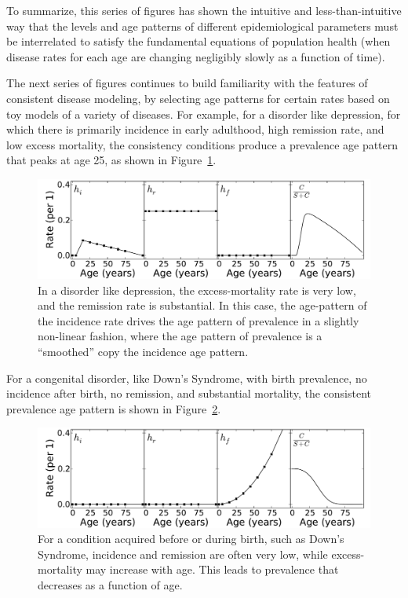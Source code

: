 To summarize, this series of figures has shown the intuitive and
less-than-intuitive way that the levels and age patterns of different
epidemiological parameters must be interrelated to satisfy the
fundamental equations of population health (when disease rates for
each age are changing negligibly slowly as a function of time).

The next series of figures continues to build familiarity with the
features of consistent disease modeling, by selecting age patterns for
certain rates based on toy models of a variety of diseases.  For
example, for a disorder like depression, for which there is primarily
incidence in early adulthood, high remission rate, and low excess
mortality, the consistency conditions produce a prevalence age pattern
that peaks at age 25, as shown in Figure~\ref{forward-sim_mental}.

\begin{figure}
\begin{center}
\includegraphics[width=\textwidth]{forward-sim-mental.pdf}
\caption{ In a disorder like depression, the excess-mortality rate is
  very low, and the remission rate is substantial.  In this case, the
  age-pattern of the incidence rate drives the age pattern of
  prevalence in a slightly non-linear fashion, where the age pattern
  of prevalence is a ``smoothed'' copy the incidence age pattern.  }
\label{forward-sim_mental}
\end{center}
\end{figure}

For a congenital disorder, like Down's Syndrome, with birth
prevalence, no incidence after birth, no remission, and substantial
mortality, the consistent prevalence age pattern is shown in
Figure~\ref{forward-sim-congenital}.

\begin{figure}[h]
\begin{center}
\includegraphics[width=\textwidth]{forward-sim-congenital.pdf}
\caption{For a condition acquired before or during birth, such as
  Down's Syndrome, incidence and remission are often very low, while
  excess-mortality may increase with age.  This leads to prevalence
  that decreases as a function of age.}
\label{forward-sim-congenital}
\end{center}
\end{figure}

